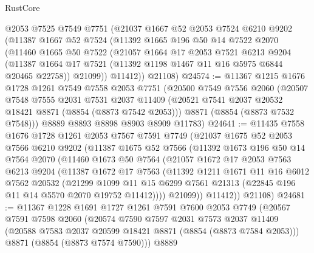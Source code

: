 \begin{lexlean}{RustCore}
\begin{coremodule}
    @2053
    @7525
    @7549
    @7751
    (@21037
      @1667
      @52
      @2053
      @7524
      @6210
      @9202
      (@11387
        @1667
        @52
        @7524
        (@11392
          @1665
          @196
          @50
          @14
          @7522
          @2070
          (@11460
            @1665
            @50
            @7522
            (@21057
              @1664
              @17
              @2053
              @7521
              @6213
              @9204
              (@11387 @1664 @17 @7521 (@11392 @1198 @1467 @11 @16 @5975 @6844 @20465 @22758))
              @21099))
          @11412))
      @21108)
@24574 := @11367
    @1215
    @1676
    @1728
    @1261
    @7549
    @7558
    @2053
    @7751
    (@20500
      @7549
      @7556
      @2060
      (@20507
        @7548
        @7555
        @2031
        @7531
        @2037
        @11409
        (@20521 @7541 @2037 @20532 @18421 @8871 (@8854 (@8873 @7542 @2053)))
        @8871
        (@8854 (@8873 @7532 @7548)))
      @8889
      @8893
      @8898
      @8903
      @8909
      @11783)
@24641 := @11435
    @7558
    @1676
    @1728
    @1261
    @2053
    @7567
    @7591
    @7749
    (@21037
      @1675
      @52
      @2053
      @7566
      @6210
      @9202
      (@11387
        @1675
        @52
        @7566
        (@11392
          @1673
          @196
          @50
          @14
          @7564
          @2070
          (@11460
            @1673
            @50
            @7564
            (@21057
              @1672
              @17
              @2053
              @7563
              @6213
              @9204
              (@11387
                @1672
                @17
                @7563
                (@11392
                  @1211
                  @1671
                  @11
                  @16
                  @6012
                  @7562
                  @20532
                  (@21299
                    @1099
                    @11
                    @15
                    @6299
                    @7561
                    @21313
                    (@22845 @196 @11 @14 @5570 @2070 @19752 @11412))))
              @21099))
          @11412))
      @21108)
@24681 := @11367
    @1228
    @1691
    @1727
    @1261
    @7591
    @7600
    @2053
    @7749
    (@20567
      @7591
      @7598
      @2060
      (@20574
        @7590
        @7597
        @2031
        @7573
        @2037
        @11409
        (@20588 @7583 @2037 @20599 @18421 @8871 (@8854 (@8873 @7584 @2053)))
        @8871
        (@8854 (@8873 @7574 @7590)))
      @8889

\end{coremodule}
\end{lexlean}
